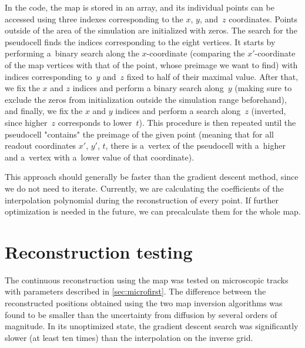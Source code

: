 			In the code, the map is stored in an array, and its individual points can be accessed using three indexes corresponding to the $x$, $y$, and~$z$ coordinates. Points outside of the area of the simulation are initialized with zeros. The search for the pseudocell finds the indices corresponding to the eight vertices. It starts by performing a~binary search along the $x$\nobreakdash-coordinate (comparing the $x'$\nobreakdash-coordinate of the map vertices with that of the point, whose preimage we want to find) with indices corresponding to~$y$ and~$z$ fixed to half of their maximal value. After that, we fix the $x$ and $z$ indices and perform a binary search along~$y$ (making sure to exclude the zeros from initialization outside the simulation range beforehand), and finally, we fix the $x$ and $y$ indices and perform a search along~$z$ (inverted, since higher~$z$ corresponds to lower~$t$). This procedure is then repeated until the pseudocell "contains" the preimage of the given point (meaning that for all readout coordinates $x'$, $y'$, $t$, there is a~vertex of the pseudocell with a~higher and a~vertex with a~lower value of that coordinate).
			
			This approach should generally be faster than the gradient descent method, since we do not need to iterate. Currently, we are calculating the coefficients of the interpolation polynomial during the reconstruction of every point. If further optimization is needed in the future, we can precalculate them for the whole map.
			
		\section{Reconstruction testing}
			The continuous reconstruction using the map was tested on microscopic tracks with parameters described in \cref{sec:microfirst}. The difference between the reconstructed positions obtained using the two map inversion algorithms was found to be smaller than the uncertainty from diffusion by several orders of magnitude. In its unoptimized state, the gradient descent search was significantly slower (at least ten times) than the interpolation on the inverse grid.
			
